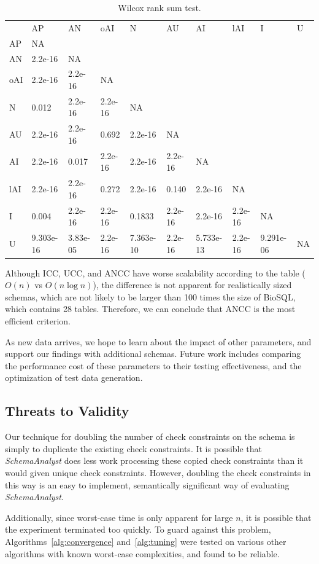 \begin{table}[h]
\begin{tabular}{llllllllll}
    & AP        & AN       & oAI     & N         & AU      & AI        & lAI     & I         & U  \\
AP  & NA        &          &         &           &         &           &         &           &    \\
AN  & 2.2e-16   & NA       &         &           &         &           &         &           &    \\
oAI & 2.2e-16   & 2.2e-16  & NA      &           &         &           &         &           &    \\
N   & 0.012     & 2.2e-16  & 2.2e-16 & NA        &         &           &         &           &    \\
AU  & 2.2e-16   & 2.2e-16  & 0.692   & 2.2e-16   & NA      &           &         &           &    \\
AI  & 2.2e-16   & 0.017    & 2.2e-16 & 2.2e-16   & 2.2e-16 & NA        &         &           &    \\
lAI & 2.2e-16   & 2.2e-16  & 0.272   & 2.2e-16   & 0.140   & 2.2e-16   & NA      &           &    \\
I   & 0.004     & 2.2e-16  & 2.2e-16 & 0.1833    & 2.2e-16 & 2.2e-16   & 2.2e-16 & NA        &    \\
U   & 9.303e-16 & 3.83e-05 & 2.2e-16 & 7.363e-10 & 2.2e-16 & 5.733e-13 & 2.2e-16 & 9.291e-06 & NA
\end{tabular}
\caption{Wilcox rank sum test.}
\end{table}

Although ICC, UCC, and ANCC have worse scalability according to the
table ($O(n)$ vs $O(n\log n)$), the difference is not apparent for
realistically sized schemas, which are not likely to
be larger than 100 times the size of BioSQL, which contains 28 tables.
Therefore, we can conclude that ANCC is the most efficient criterion.  

As new data arrives, we hope to learn about the impact of other
parameters, and support our findings with additional schemas. 
Future work includes comparing the performance cost of these
parameters to their testing effectiveness, and the optimization of test data generation.
\subsection*{Threats to Validity}

Our technique for doubling the number of check constraints on the schema
is simply to duplicate the existing check constraints. It is possible
that \textit{SchemaAnalyst} does less work processing these copied check
constraints than it would given unique check constraints. However,
doubling the check constraints in this way is an easy to implement,
semantically significant way of evaluating \textit{SchemaAnalyst}.

Additionally, since worst-case time is only apparent for large $n$, 
it is possible that the experiment terminated too quickly.  To guard 
against this problem, Algorithms~\ref{alg:convergence} and~\ref{alg:tuning}
were tested on various other algorithms with known worst-case complexities, and 
found to be reliable.
